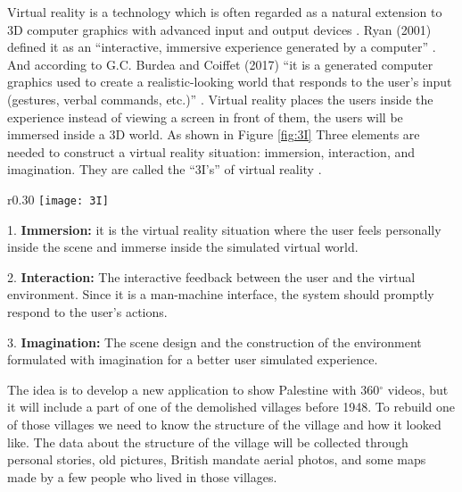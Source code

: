 
  
Virtual reality is a technology which is often regarded as a natural extension to 3D computer graphics with advanced input and output devices \citep{Jayaram1997}. Ryan (2001) defined it as an “interactive, immersive experience generated by a computer” \citep{Ryan2001}. And according to G.C. Burdea and Coiffet (2017) “it is a generated computer graphics used to create a realistic-looking world that responds to the user’s input (gestures, verbal commands, etc.)” \citep{burdea2017virtual}. Virtual reality places the users inside the experience instead of viewing a screen in front of them, the users will be immersed inside a 3D world. As shown in Figure \ref{fig:3I} Three elements are needed to construct a virtual reality situation: immersion, interaction, and imagination. They are called the “3I’s” of virtual reality \citep{Hu2016}.


\begin{wrapfigure}{r}{0.30\textwidth} %
    \centering
    \texttt{[image: 3I]}
    \caption{The 3I's of Virtual Reality - © 2003 by John Wiley \& Sons Inc. All rights
reserved}
    \label{fig:3I}
\end{wrapfigure}

1. \textbf{Immersion:} it is the virtual reality situation where the user feels personally inside the
scene and immerse inside the simulated virtual world.



2. \textbf{Interaction:} The interactive feedback between the user
and the virtual environment. Since it is a man-machine
interface, the system should promptly respond to the
user’s actions.


3. \textbf{Imagination:} The scene design and the construction of
the environment formulated with imagination for a
better user simulated experience.


  
  
  
The idea is to develop a new application to show Palestine with 360$^{\circ}$ videos, but it will include a part of one of the demolished villages before 1948. To rebuild one of those villages we need to know the structure of the village and how it looked like. The data about the structure of the village will be collected through personal stories, old pictures, British mandate aerial photos, and some maps made by a few people who lived in those villages. 
  
